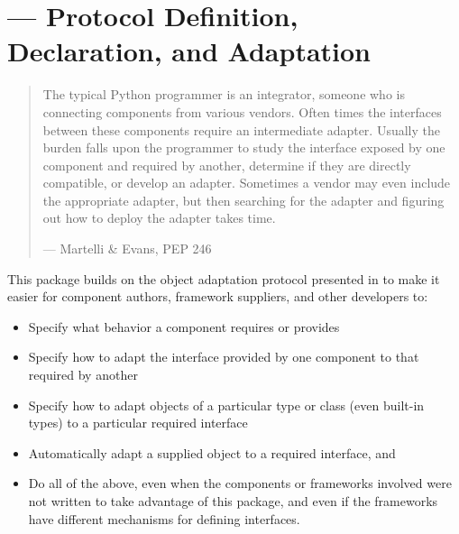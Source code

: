 \section{ ---
         Protocol Definition, Declaration, and Adaptation}

\begin{quotation}
The typical Python programmer is an integrator, someone who is
connecting components from various vendors.  Often times the
interfaces between these components require an intermediate
adapter.  Usually the burden falls upon the programmer to
study the interface exposed by one component and required by
another, determine if they are directly compatible, or develop
an adapter.  Sometimes a vendor may even include the
appropriate adapter, but then searching for the adapter and
figuring out how to deploy the adapter takes time.

\hfill --- Martelli \& Evans, PEP 246
\end{quotation}

This package builds on the object adaptation protocol presented in 
to make it easier for component authors, framework suppliers, and other
developers to:

\begin{itemize}

\item Specify what behavior a component requires or provides

\item Specify how to adapt the interface provided by one component to that
required by another

\item Specify how to adapt objects of a particular type or class (even
built-in types) to a particular required interface

\item Automatically adapt a supplied object to a required interface, and

\item Do all of the above, even when the components or frameworks involved
were not written to take advantage of this package, and even if the frameworks
have different mechanisms for defining interfaces.
\end{itemize}

